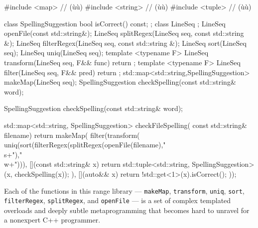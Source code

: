 \begin{emcppshiddenlisting}[emcppsbatch={e13,e14},emcppsstandards=c++14]
#include <map>     // (ù{}ù)
#include <string>  // (ù{}ù)
#include <tuple>   // (ù{}ù)

class SpellingSuggestion {
    bool isCorrect() const;
};
class LineSeq {};
LineSeq openFile(const std::string&);
LineSeq splitRegex(LineSeq seq, const std::string &);
LineSeq filterRegex(LineSeq seq, const std::string &);
LineSeq sort(LineSeq seq);
LineSeq uniq(LineSeq seq);
template <typename F>
LineSeq transform(LineSeq seq, F&& func) { return {}; }
template <typename F>
LineSeq filter(LineSeq seq, F&& pred) { return {}; }
std::map<std::string,SpellingSuggestion> makeMap(LineSeq seq);
SpellingSuggestion checkSpelling(const std::string& word);
\end{emcppshiddenlisting}
\begin{emcppslisting}[emcppsbatch=e13]
SpellingSuggestion checkSpelling(const std::string& word);

std::map<std::string, SpellingSuggestion> checkFileSpelling(
                                                   const std::string& filename)
{
    return makeMap(
        filter(transform(
           uniq(sort(filterRegex(splitRegex(openFile(filename),"\\s+"),"\\w+"))),
        [](const std::string& x)
        {
            return std::tuple<std::string, SpellingSuggestion>(x,
                                                             checkSpelling(x));
        }
   ), [](auto&& x) { return !std::get<1>(x).isCorrect(); }));
}
\end{emcppslisting}


\noindent Each of the functions in this range library --- \lstinline!makeMap!,
\lstinline!transform!, \lstinline!uniq!, \lstinline!sort!, \lstinline!filterRegex!,
\lstinline!splitRegex!, and \lstinline!openFile! --- is a set of complex
templated overloads and deeply subtle metaprogramming that becomes hard
to unravel for a nonexpert C++ programmer.

